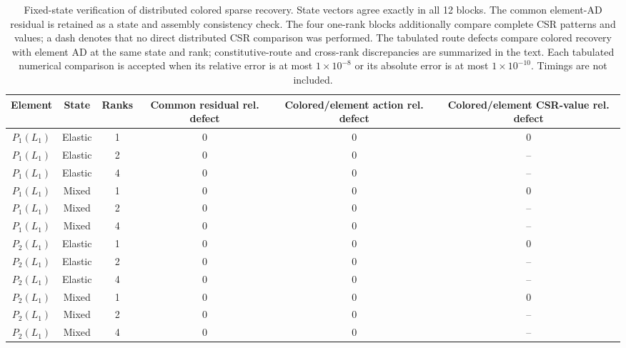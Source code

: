 \begin{table}[t]
  \caption{Fixed-state verification of distributed colored sparse recovery. State vectors agree exactly in all 12 blocks. The common element-AD residual is retained as a state and assembly consistency check. The four one-rank blocks additionally compare complete CSR patterns and values; a dash denotes that no direct distributed CSR comparison was performed. The tabulated route defects compare colored recovery with element AD at the same state and rank; constitutive-route and cross-rank discrepancies are summarized in the text. Each tabulated numerical comparison is accepted when its relative error is at most $1 \times 10^{-8}$ or its absolute error is at most $1 \times 10^{-10}$. Timings are not included.}
  \label{tab:distributed-colored-verification}
  \centering
  \begin{tabularx}{\linewidth}{C{0.70}C{1.05}C{0.65}C{1.20}C{1.20}C{1.20}}
    \toprule
    Element & State & Ranks & Common residual rel. defect & Colored/element action rel. defect & Colored/element CSR-value rel. defect \\
    \midrule
    $P_1(L_1)$ & Elastic & 1 & $0$ & $0$ & $0$ \\
    $P_1(L_1)$ & Elastic & 2 & $0$ & $0$ & -- \\
    $P_1(L_1)$ & Elastic & 4 & $0$ & $0$ & -- \\
    $P_1(L_1)$ & Mixed & 1 & $0$ & $0$ & $0$ \\
    $P_1(L_1)$ & Mixed & 2 & $0$ & $0$ & -- \\
    $P_1(L_1)$ & Mixed & 4 & $0$ & $0$ & -- \\
    $P_2(L_1)$ & Elastic & 1 & $0$ & $0$ & $0$ \\
    $P_2(L_1)$ & Elastic & 2 & $0$ & $0$ & -- \\
    $P_2(L_1)$ & Elastic & 4 & $0$ & $0$ & -- \\
    $P_2(L_1)$ & Mixed & 1 & $0$ & $0$ & $0$ \\
    $P_2(L_1)$ & Mixed & 2 & $0$ & $0$ & -- \\
    $P_2(L_1)$ & Mixed & 4 & $0$ & $0$ & -- \\
    \bottomrule
  \end{tabularx}
\end{table}
